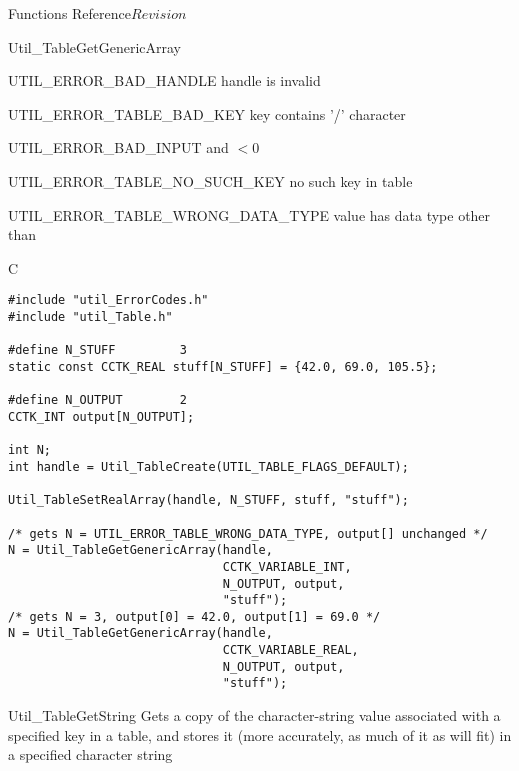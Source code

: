 \begin{cactuspart}{ Functions Reference}{}{$Revision$}
\begin{FunctionDescription}{Util\_TableGetGenericArray}
\begin{ErrorSection}
\begin{Error}{UTIL\_ERROR\_BAD\_HANDLE}
handle is invalid
\end{Error}
\begin{Error}{UTIL\_ERROR\_TABLE\_BAD\_KEY}
key contains '/' character
\end{Error}
\begin{Error}{UTIL\_ERROR\_BAD\_INPUT}
 and  $< 0$
\end{Error}
\begin{Error}{UTIL\_ERROR\_TABLE\_NO\_SUCH\_KEY}
no such key in table
\end{Error}
\begin{Error}{UTIL\_ERROR\_TABLE\_WRONG\_DATA\_TYPE}
value has data type other than 
\end{Error}
\end{ErrorSection}

\begin{ExampleSection}
\begin{Example}{C}
\begin{verbatim}
#include "util_ErrorCodes.h"
#include "util_Table.h"

#define N_STUFF         3
static const CCTK_REAL stuff[N_STUFF] = {42.0, 69.0, 105.5};

#define N_OUTPUT        2
CCTK_INT output[N_OUTPUT];

int N;
int handle = Util_TableCreate(UTIL_TABLE_FLAGS_DEFAULT);

Util_TableSetRealArray(handle, N_STUFF, stuff, "stuff");

/* gets N = UTIL_ERROR_TABLE_WRONG_DATA_TYPE, output[] unchanged */
N = Util_TableGetGenericArray(handle,
                              CCTK_VARIABLE_INT,
                              N_OUTPUT, output,
                              "stuff");
/* gets N = 3, output[0] = 42.0, output[1] = 69.0 */
N = Util_TableGetGenericArray(handle,
                              CCTK_VARIABLE_REAL,
                              N_OUTPUT, output,
                              "stuff");
\end{verbatim}
\end{Example}
\end{ExampleSection}
\end{FunctionDescription}


\begin{FunctionDescription}{Util\_TableGetString}
\label{Util-TableGetString}
Gets a copy of the character-string value associated with a specified
key in a table, and stores it (more accurately, as much of it as will fit)
in a specified character string


\end{FunctionDescription}
\end{cactuspart}
